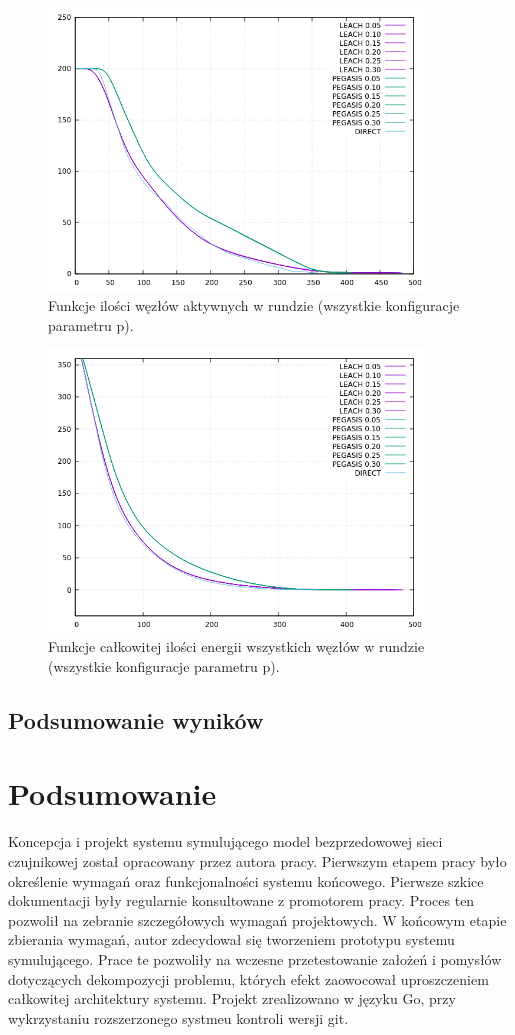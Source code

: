 \documentclass[a4paper,12pt,twoside,openany]{report}
\begin{document}
\begin{figure}[H]
 \centering
 \includegraphics[width=10cm]{images/gnuplot/test_4/nodes_in_round_all.png}
 \caption{Funkcje ilości węzłów aktywnych w rundzie (wszystkie konfiguracje parametru p).}
\end{figure}

\begin{figure}[H]
 \centering
 \includegraphics[width=10cm]{images/gnuplot/test_4/energy_in_round_all.png}
 \caption{Funkcje całkowitej ilości energii wszystkich węzłów w rundzie (wszystkie konfiguracje parametru p).}
\end{figure}

\section{Podsumowanie wyników}


\chapter{Podsumowanie}
Koncepcja i projekt systemu symulującego model bezprzedowowej sieci czujnikowej został opracowany przez autora pracy.
Pierwszym etapem pracy było określenie wymagań oraz funkcjonalności systemu końcowego. Pierwsze szkice dokumentacji były regularnie konsultowane z promotorem pracy.
Proces ten pozwolił na zebranie szczegółowych wymagań projektowych. W końcowym etapie zbierania wymagań, autor zdecydował się tworzeniem prototypu systemu symulującego.
Prace te pozwoliły na wczesne przetestowanie założeń i pomysłów dotyczących dekompozycji problemu, których efekt zaowocował uproszczeniem całkowitej architektury systemu.
Projekt zrealizowano w języku Go, przy wykrzystaniu rozszerzonego systmeu kontroli wersji git.
\end{document}

